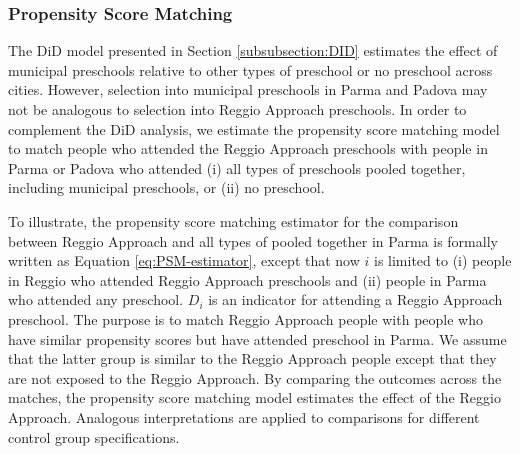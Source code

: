 \subsubsection{Propensity Score Matching}

The DiD model presented in Section \ref{subsubsection:DID} estimates the effect of municipal preschools relative to other types of preschool or no preschool across cities. However, selection into municipal preschools in Parma and Padova may not be analogous to selection into Reggio Approach preschools. In order to complement the DiD analysis, we estimate the propensity score matching model to match people who attended the Reggio Approach preschools with people in Parma or Padova who attended (i) all types of preschools pooled together, including municipal preschools, or (ii) no preschool. 

To illustrate, the propensity score matching estimator for the comparison between Reggio Approach and all types of pooled together in Parma is formally written as Equation \ref{eq:PSM-estimator}, except that now $i$ is limited to (i) people in Reggio who attended Reggio Approach preschools and (ii) people in Parma who attended any preschool. $D_i$ is an indicator for attending a Reggio Approach preschool. The purpose is to match Reggio Approach people with people who have similar propensity scores but have attended preschool in Parma. We assume that the latter group is similar to the Reggio Approach people except that they are not exposed to the Reggio Approach. By comparing the outcomes across the matches, the propensity score matching model estimates the effect of the Reggio Approach. Analogous interpretations are applied to comparisons for different control group specifications.